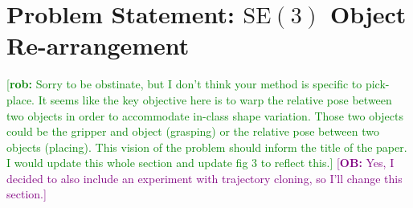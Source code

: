 \documentclass{article}
\newcommand{\ob}[1]{\textcolor{purple}{[\textbf{OB:} #1]}}
\newcommand{\rob}[1]{\textcolor{green}{[\textbf{rob:} #1]}}
\newcommand{\tk}[1]{\textcolor{magenta}{[\textbf{TK:} #1]}}
\begin{document}



\section{Problem Statement: $\mathrm{SE(3)}$ Object Re-arrangement}

\rob{Sorry to be obstinate, but I don't think your method is specific to pick-place. It seems like the key objective here is to warp the relative pose between two objects in order to accommodate in-class shape variation. Those two objects could be the gripper and object (grasping) or the relative pose between two objects (placing). This vision of the problem should inform the title of the paper. I would update this whole section and update fig 3 to reflect this.} \ob{Yes, I decided to also include an experiment with trajectory cloning, so I'll change this section.}
\end{document}
